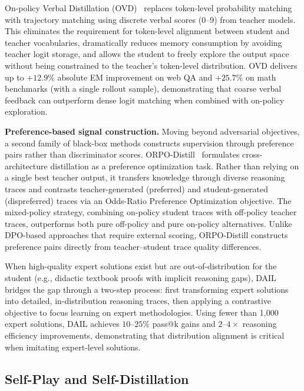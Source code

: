 \documentclass{article} %
\begin{document}
On-policy Verbal Distillation (OVD)~\citep{2601.21968} replaces token-level probability matching with trajectory matching using discrete verbal scores (0--9) from teacher models. This eliminates the requirement for token-level alignment between student and teacher vocabularies, dramatically reduces memory consumption by avoiding teacher logit storage, and allows the student to freely explore the output space without being constrained to the teacher's token-level distribution. OVD delivers up to $+12.9\%$ absolute EM improvement on web QA and $+25.7\%$ on math benchmarks (with a single rollout sample), demonstrating that coarse verbal feedback can outperform dense logit matching when combined with on-policy exploration.

\textbf{Preference-based signal construction.}
Moving beyond adversarial objectives, a second family of black-box methods constructs supervision through preference pairs rather than discriminator scores.
ORPO-Distill~\citep{2509.25100} formulates cross-architecture distillation as a preference optimization task. Rather than relying on a single best teacher output, it transfers knowledge through diverse reasoning traces and contrasts teacher-generated (preferred) and student-generated (dispreferred) traces via an Odds-Ratio Preference Optimization objective. The mixed-policy strategy, combining on-policy student traces with off-policy teacher traces, outperforms both pure off-policy and pure on-policy alternatives. Unlike DPO-based approaches that require external scoring, ORPO-Distill constructs preference pairs directly from teacher--student trace quality differences.

When high-quality expert solutions exist but are out-of-distribution for the student (e.g., didactic textbook proofs with implicit reasoning gaps), DAIL~\citep{2602.02405} bridges the gap through a two-step process: first transforming expert solutions into detailed, in-distribution reasoning traces, then applying a contrastive objective to focus learning on expert methodologies. Using fewer than 1,000 expert solutions, DAIL achieves $10$--$25\%$ pass@k gains and $2$--$4\times$ reasoning efficiency improvements, demonstrating that distribution alignment is critical when imitating expert-level solutions.

\subsection{Self-Play and Self-Distillation}
\label{subsec:self_distill}
\end{document}
